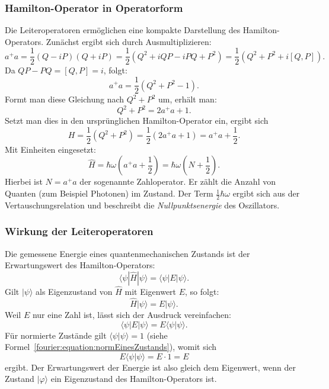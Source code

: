 		\subsubsection{Hamilton-Operator in Operatorform\label{fourier:subsubsection:HamiltonOperatorInOperatorform}}
			Die Leiteroperatoren ermöglichen eine kompakte Darstellung des Hamilton-Operators.
			Zunächst ergibt sich durch Ausmultiplizieren:
			\[
				a^+a = \frac{1}{2}(Q - iP)(Q + iP) = \frac{1}{2}(Q^2 + iQP - iPQ + P^2) = \frac{1}{2}(Q^2 + P^2 + i[Q, P]).
			\]
			Da $QP - PQ = [Q, P] = i$, folgt:
			\[
				a^+a = \frac{1}{2}(Q^2 + P^2 - 1).
			\]
			Formt man diese Gleichung nach $Q^2 + P^2$ um, erhält man:
			\[
				Q^2 + P^2 = 2a^+a + 1.
			\]
			Setzt man dies in den ursprünglichen Hamilton-Operator ein, ergibt sich
			\[
				H = \frac{1}{2}(Q^2 + P^2) = \frac{1}{2}(2a^+a + 1) = a^+a + \frac{1}{2}.
			\]
			Mit Einheiten eingesetzt:
			\begin{equation}
				\hat{H} = \hbar\omega \left(a^+ a + \frac{1}{2}\right) = \hbar\omega \left(N + \frac{1}{2}\right).
			\end{equation}
			Hierbei ist $N = a^+a$ der sogenannte Zahloperator.
			Er zählt die Anzahl von Quanten (zum Beispiel Photonen) im Zustand.
			Der Term $\frac{1}{2}\hbar\omega$ ergibt sich aus der Vertauschungsrelation und beschreibt die \emph{Nullpunktsenergie} des Oszillators.
		
		\subsubsection{Wirkung der Leiteroperatoren\label{fourier:subsubsection:WirkungLeiteroperatoren}}
			Die gemessene Energie eines quantenmechanischen Zustands ist der Erwartungswert des Hamilton-Operators:
			\begin{equation}
				\langle\psi|\hat{H}|\psi\rangle = \langle\psi|E|\psi\rangle.
			\end{equation}
			Gilt $|\psi\rangle$ als Eigenzustand von $\hat{H}$ mit Eigenwert $E$, so folgt:
			\[
				\hat{H}|\psi\rangle = E|\psi\rangle.
			\]
			Weil $E$ nur eine Zahl ist, lässt sich der Ausdruck vereinfachen:
			\[
				\langle\psi|E|\psi\rangle = E \langle\psi|\psi\rangle.
			\]
			Für normierte Zustände gilt $\langle\psi|\psi\rangle = 1$ (siehe Formel~\ref{fourier:equation:normEinesZustands}), womit sich
			\[
				E \langle\psi|\psi\rangle = E \cdot 1 = E
			\]
			ergibt.
			Der Erwartungswert der Energie ist also gleich dem Eigenwert, wenn der Zustand $|\varphi\rangle$ ein Eigenzustand des Hamilton-Operators ist.
			
